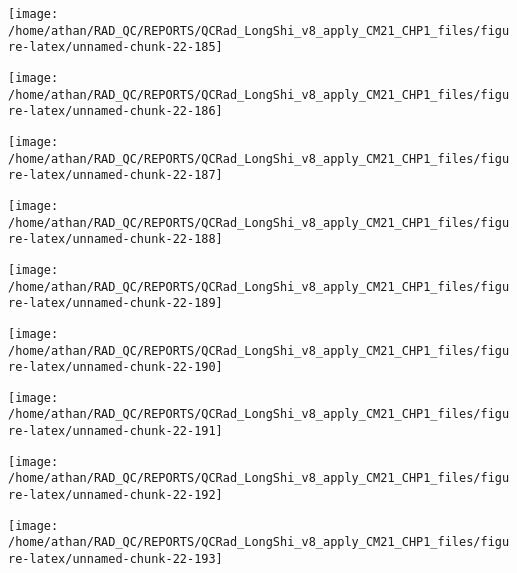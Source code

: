 \documentclass[
  10pt,
  a4paper,oneside]{article}
\begin{document}
\begin{center}\texttt{[image: /home/athan/RAD\_QC/REPORTS/QCRad\_LongShi\_v8\_apply\_CM21\_CHP1\_files/figure-latex/unnamed-chunk-22-185]} \end{center}

\begin{center}\texttt{[image: /home/athan/RAD\_QC/REPORTS/QCRad\_LongShi\_v8\_apply\_CM21\_CHP1\_files/figure-latex/unnamed-chunk-22-186]} \end{center}

\begin{center}\texttt{[image: /home/athan/RAD\_QC/REPORTS/QCRad\_LongShi\_v8\_apply\_CM21\_CHP1\_files/figure-latex/unnamed-chunk-22-187]} \end{center}

\begin{center}\texttt{[image: /home/athan/RAD\_QC/REPORTS/QCRad\_LongShi\_v8\_apply\_CM21\_CHP1\_files/figure-latex/unnamed-chunk-22-188]} \end{center}

\begin{center}\texttt{[image: /home/athan/RAD\_QC/REPORTS/QCRad\_LongShi\_v8\_apply\_CM21\_CHP1\_files/figure-latex/unnamed-chunk-22-189]} \end{center}

\begin{center}\texttt{[image: /home/athan/RAD\_QC/REPORTS/QCRad\_LongShi\_v8\_apply\_CM21\_CHP1\_files/figure-latex/unnamed-chunk-22-190]} \end{center}

\begin{center}\texttt{[image: /home/athan/RAD\_QC/REPORTS/QCRad\_LongShi\_v8\_apply\_CM21\_CHP1\_files/figure-latex/unnamed-chunk-22-191]} \end{center}

\begin{center}\texttt{[image: /home/athan/RAD\_QC/REPORTS/QCRad\_LongShi\_v8\_apply\_CM21\_CHP1\_files/figure-latex/unnamed-chunk-22-192]} \end{center}

\begin{center}\texttt{[image: /home/athan/RAD\_QC/REPORTS/QCRad\_LongShi\_v8\_apply\_CM21\_CHP1\_files/figure-latex/unnamed-chunk-22-193]} \end{center}
\end{document}
